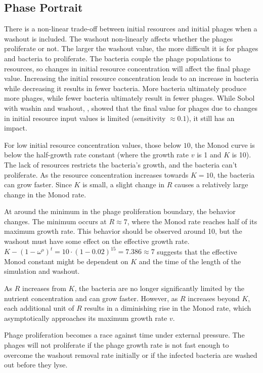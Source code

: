 \subsection{Phase Portrait}
There is a non-linear trade-off between initial resources and initial phages when a washout is included. 
The washout non-linearly affects whether the phages proliferate or not. 
The larger the washout value, the more difficult it is for phages and bacteria to proliferate. 
The bacteria couple the phage populations to resources, so changes in initial resource concentration will affect the final phage value. 
Increasing the initial resource concentration leads to an increase in bacteria while decreasing it results in fewer bacteria.
More bacteria ultimately produce more phages, while fewer bacteria ultimately result in fewer phages.
While Sobol with washin and washout, , showed that the final value for phages due to changes in initial resource input values is limited (sensitivity $\approx 0.1$), it still has an impact. 

For low initial resource concentration values, those below $10$, the Monod curve is below the half-growth rate constant (where the growth rate $v$ is 1 and $K$ is 10). 
The lack of resources restricts the bacteria's growth, and the bacteria can't proliferate. 
As the resource concentration increases towards $K=10$, the bacteria can grow faster. 
Since $K$ is small, a slight change in $R$ causes a relatively large change in the Monod rate. 

At around the minimum in the phage proliferation boundary, the behavior changes. 
The minimum occurs at $R\approx 7$, where the Monod rate reaches half of its maximum growth rate. 
This behavior should be observed around 10, but the washout must have some effect on the effective growth rate. 
$K - (1-\omega^o)^t = 10\cdot (1-0.02)^{15} = 7.386 \approx 7$ suggests that the effective Monod constant might be dependent on $K$ and the time of the length of the simulation and washout. 

As $R$ increases from $K$, the bacteria are no longer significantly limited by the nutrient concentration and can grow faster.
However, as $R$ increases beyond $K$, each additional unit of $R$ results in a diminishing rise in the Monod rate, which asymptotically approaches its maximum growth rate $v$. 

Phage proliferation becomes a race against time under external pressure. 
The phages will not proliferate if the phage growth rate is not fast enough to overcome the washout removal rate initially or if the infected bacteria are washed out before they lyse. 

